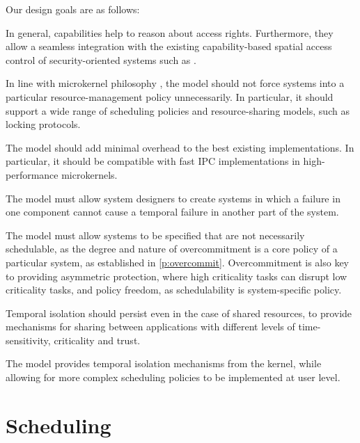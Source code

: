 Our design goals are as follows:
\begin{description}\sloppy
    \item[Capability-controlled enforcement of time limits:] In general, capabilities
      help to reason about access rights. Furthermore, they allow a
        seamless integration with the existing capability-based spatial
          access control of security-oriented systems such as \selfour.
    \item[Policy freedom:] In line with microkernel philosophy
        \citep{Heiser_Elphinstone_16}, the model should not force systems
        into a particular resource-management policy unnecessarily. In particular, it
        should support a wide range of scheduling policies and
        resource-sharing models, such as locking protocols.
    \item[Efficient:] The model should add minimal overhead to the best
                      existing implementations. In particular, it should be compatible
                        with fast \gls{IPC} implementations in high-performance microkernels.

    \item[Temporal isolation:] The model must allow system designers to create systems in which a
        failure in one component cannot cause a temporal failure in another part of the
        system.

    \item[Overcommitment:] The model must allow systems to be specified that are not necessarily
        schedulable, as the degree and nature of overcommitment is a core policy of a particular
        system, as established in \cref{p:overcommit}.
        Overcommitment is also key to providing  asymmetric protection, where high
        criticality tasks can disrupt low criticality tasks, and policy freedom, as schedulability
        is system-specific policy.

    \item[Safe resource sharing:] Temporal isolation should persist even in the case of
        shared resources, to provide mechanisms for sharing between applications with different
        levels of time-sensitivity, criticality and trust.
\end{description}

The model  provides temporal isolation mechanisms from the kernel, while allowing for more complex
scheduling policies to be implemented at user level.

\section{Scheduling}

